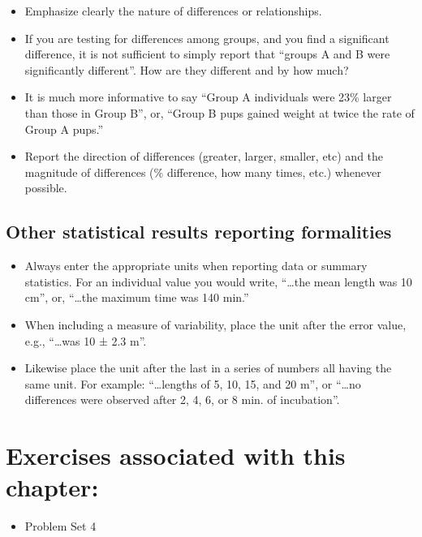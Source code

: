 \documentclass[]{book}
\providecommand{\tightlist}{%
  \setlength{\itemsep}{0pt}\setlength{\parskip}{0pt}}
\begin{document}
\begin{itemize}
\item
  Emphasize clearly the nature of differences or relationships.
\item
  If you are testing for differences among groups, and you find a significant difference, it is not sufficient to simply report that ``groups A and B were significantly different''. How are they different and by how much?
\item
  It is much more informative to say ``Group A individuals were 23\% larger than those in Group B'', or, ``Group B pups gained weight at twice the rate of Group A pups.''
\item
  Report the direction of differences (greater, larger, smaller, etc) and the magnitude of differences (\% difference, how many times, etc.) whenever possible.
\end{itemize}

\hypertarget{other-statistical-results-reporting-formalities}{%
\subsection{Other statistical results reporting formalities}\label{other-statistical-results-reporting-formalities}}

\begin{itemize}
\item
  Always enter the appropriate units when reporting data or summary statistics. For an individual value you would write, ``\ldots{}the mean length was 10 cm'', or, ``\ldots{}the maximum time was 140 min.''
\item
  When including a measure of variability, place the unit after the error value, e.g., ``\ldots{}was 10 ± 2.3 m''.
\item
  Likewise place the unit after the last in a series of numbers all having the same unit. For example: ``\ldots{}lengths of 5, 10, 15, and 20 m'', or ``\ldots{}no differences were observed after 2, 4, 6, or 8 min. of incubation''.
\end{itemize}

\hypertarget{exercises-associated-with-this-chapter-9}{%
\section{Exercises associated with this chapter:}\label{exercises-associated-with-this-chapter-9}}

\begin{itemize}
\tightlist
\item
  Problem Set 4
\end{itemize}
\end{document}
